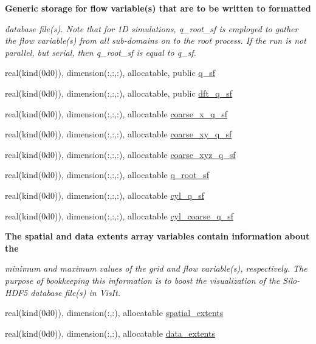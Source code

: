 \begin{Indent}\textbf{ Generic storage for flow variable(s) that are to be written to formatted}\par
{\em database file(s). Note that for 1D simulations, q\+\_\+root\+\_\+sf is employed to gather the flow variable(s) from all sub-\/domains on to the root process. If the run is not parallel, but serial, then q\+\_\+root\+\_\+sf is equal to q\+\_\+sf. }\begin{DoxyCompactItemize}
\item 
real(kind(0d0)), dimension(\+:,\+:,\+:), allocatable, public \hyperlink{namespacem__data__output_aa211f0ff6c5213825ff0d7fa0357ccef}{q\+\_\+sf}
\item 
real(kind(0d0)), dimension(\+:,\+:,\+:), allocatable, public \hyperlink{namespacem__data__output_a94a7c7e9bb108dc2d3360e1cd40d4909}{dft\+\_\+q\+\_\+sf}
\item 
real(kind(0d0)), dimension(\+:,\+:,\+:), allocatable \hyperlink{namespacem__data__output_a8a822ed22e0ffe582b2dc7f49109fa1d}{coarse\+\_\+x\+\_\+q\+\_\+sf}
\item 
real(kind(0d0)), dimension(\+:,\+:,\+:), allocatable \hyperlink{namespacem__data__output_a9d75551d2f262e079c3b6397404d5a79}{coarse\+\_\+xy\+\_\+q\+\_\+sf}
\item 
real(kind(0d0)), dimension(\+:,\+:,\+:), allocatable \hyperlink{namespacem__data__output_ac2d6c1c8ab5cc7a2762b462673086bbe}{coarse\+\_\+xyz\+\_\+q\+\_\+sf}
\item 
real(kind(0d0)), dimension(\+:,\+:,\+:), allocatable \hyperlink{namespacem__data__output_af74e742ddb67173d205d037902ce73f4}{q\+\_\+root\+\_\+sf}
\item 
real(kind(0d0)), dimension(\+:,\+:,\+:), allocatable \hyperlink{namespacem__data__output_a0a9ac4d26ce8ac2ea87cacf581b49692}{cyl\+\_\+q\+\_\+sf}
\item 
real(kind(0d0)), dimension(\+:,\+:,\+:), allocatable \hyperlink{namespacem__data__output_a6dbb29fcb50e8ca2140326f4ba85dd02}{cyl\+\_\+coarse\+\_\+q\+\_\+sf}
\end{DoxyCompactItemize}
\end{Indent}
\begin{Indent}\textbf{ The spatial and data extents array variables contain information about the}\par
{\em minimum and maximum values of the grid and flow variable(s), respectively. The purpose of bookkeeping this information is to boost the visualization of the Silo-\/\+H\+D\+F5 database file(s) in Vis\+It. }\begin{DoxyCompactItemize}
\item 
real(kind(0d0)), dimension(\+:,\+:), allocatable \hyperlink{namespacem__data__output_a20a29bb6bd9724b83d4abab91f1b99a3}{spatial\+\_\+extents}
\item 
real(kind(0d0)), dimension(\+:,\+:), allocatable \hyperlink{namespacem__data__output_a10cecf686032e4df4cd0b9835b159d07}{data\+\_\+extents}
\end{DoxyCompactItemize}
\end{Indent}
